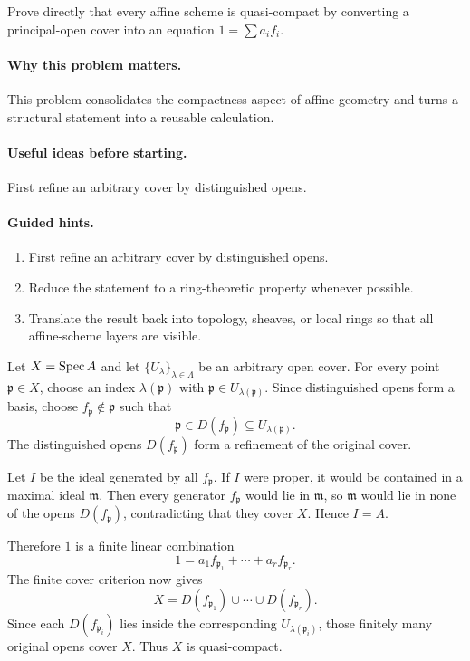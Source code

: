 \begin{problem}\label{prob:vi18-p05}
Prove directly that every affine scheme is quasi-compact by converting a principal-open cover into an equation $1=\sum a_if_i$.
\end{problem}

\ifdefined\FullProblemDossiers
\paragraph{Why this problem matters.}
This problem consolidates the compactness aspect of affine geometry and turns a structural statement into a reusable calculation.

\paragraph{Useful ideas before starting.}
First refine an arbitrary cover by distinguished opens.

\paragraph{Guided hints.}
\begin{enumerate}
\item First refine an arbitrary cover by distinguished opens.
\item Reduce the statement to a ring-theoretic property whenever possible.
\item Translate the result back into topology, sheaves, or local rings so that all affine-scheme layers are visible.
\end{enumerate}

\begin{solution}
Let $X=\operatorname{Spec} A$ and let $\{U_\lambda\}_{\lambda\in\Lambda}$ be an arbitrary open cover. For every point $\mathfrak p\in X$, choose an index $\lambda(\mathfrak p)$ with $\mathfrak p\in U_{\lambda(\mathfrak p)}$. Since distinguished opens form a basis, choose $f_{\mathfrak p}\notin\mathfrak p$ such that
\[
\mathfrak p\in D(f_{\mathfrak p})\subseteq U_{\lambda(\mathfrak p)}.
\]
The distinguished opens $D(f_{\mathfrak p})$ form a refinement of the original cover.

Let $I$ be the ideal generated by all $f_{\mathfrak p}$. If $I$ were proper, it would be contained in a maximal ideal $\mathfrak m$. Then every generator $f_{\mathfrak p}$ would lie in $\mathfrak m$, so $\mathfrak m$ would lie in none of the opens $D(f_{\mathfrak p})$, contradicting that they cover $X$. Hence $I=A$.

Therefore $1$ is a finite linear combination
\[
1=a_1f_{\mathfrak p_1}+\cdots+a_rf_{\mathfrak p_r}.
\]
The finite cover criterion now gives
\[
X=D(f_{\mathfrak p_1})\cup\cdots\cup D(f_{\mathfrak p_r}).
\]
Since each $D(f_{\mathfrak p_i})$ lies inside the corresponding $U_{\lambda(\mathfrak p_i)}$, those finitely many original opens cover $X$. Thus $X$ is quasi-compact.
\end{solution}


